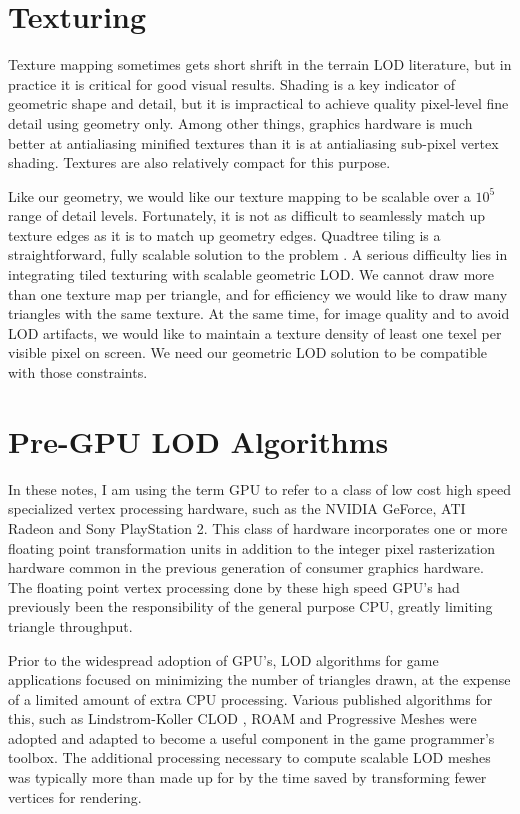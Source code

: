 \documentclass[12pt]{article}
\begin{document}
\section{Texturing}

Texture mapping sometimes gets short shrift in the terrain LOD
literature, but in practice it is critical for good visual results.
Shading is a key indicator of geometric shape and detail, but it is
impractical to achieve quality pixel-level fine detail using geometry
only.  Among other things, graphics hardware is much better at
antialiasing minified textures than it is at antialiasing sub-pixel
vertex shading.  Textures are also relatively compact for this
purpose.
 
Like our geometry, we would like our texture mapping to be scalable
over a $10^5$ range of detail levels.  Fortunately, it is not as
difficult to seamlessly match up texture edges as it is to match up
geometry edges.  Quadtree tiling is a straightforward, fully scalable
solution to the problem \cite{ulrich01}.  A serious difficulty lies in
integrating tiled texturing with scalable geometric LOD.  We cannot
draw more than one texture map per triangle, and for efficiency we
would like to draw many triangles with the same texture.  At the same
time, for image quality and to avoid LOD artifacts, we would like to
maintain a texture density of least one texel per visible pixel on
screen.  We need our geometric LOD solution to be compatible with
those constraints.
 
\section{Pre-GPU LOD Algorithms}

In these notes, I am using the term GPU to refer to a class of low
cost high speed specialized vertex processing hardware, such as the
NVIDIA GeForce, ATI Radeon and Sony PlayStation 2.  This class of
hardware incorporates one or more floating point transformation units
in addition to the integer pixel rasterization hardware common in the
previous generation of consumer graphics hardware.  The floating point
vertex processing done by these high speed GPU's had previously been
the responsibility of the general purpose CPU, greatly limiting
triangle throughput.
 
Prior to the widespread adoption of GPU's, LOD algorithms for game
applications focused on minimizing the number of triangles drawn, at
the expense of a limited amount of extra CPU processing.  Various
published algorithms for this, such as Lindstrom-Koller CLOD
\cite{lindstrom96}, ROAM \cite{duchaineau} and Progressive Meshes
\cite{hoppe96} were adopted and adapted to become a useful component
in the game programmer's toolbox.  The additional processing necessary
to compute scalable LOD meshes was typically more than made up for by
the time saved by transforming fewer vertices for rendering.
\end{document}
